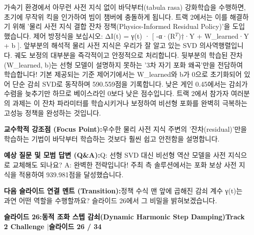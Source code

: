 \documentclass[11pt,a4paper]{article}
\begin{document}
\begin{tcolorbox}[colback=white,colframe=primaryblue,title={\footnotesize\bfseries\color{white}발표자 구두 대본 (Spoken Script)},fontupper=\small,left=6pt,right=6pt,top=3pt,bottom=3pt,boxrule=0.8pt,arc=2.5pt]
가속기 환경에서 아무런 사전 지식 없이 바닥부터(tabula rasa) 강화학습을 수행하면, 초기에 무작위 킥을 인가하여 빔이 챔버에 충돌하게 됩니다. 트랙 2에서는 이를 해결하기 위해 '물리 사전 지식 결합 잔차 정책(Physics-Informed Residual Policy)'을 도입했습니다. 제어 방정식을 보십시오: ΔI(t) = γ(t) · [ -α·(R$^T$)†·Y + W\_learned·Y + b ]. 앞부분의 해석적 물리 사전 지식은 우리가 잘 알고 있는 SVD 의사역행렬입니다. 궤도 보정의 대부분을 즉각적이고 안정적으로 처리합니다. 뒷부분의 학습된 잔차(W\_learned, b)는 선형 모델이 설명하지 못하는 '3차 자기 포화 왜곡'만을 전담하여 학습합니다! 기본 제공되는 기준 제어기에서는 W\_learned와 b가 0으로 초기화되어 있어 단순 감쇠 SVD로 동작하며 590.559점을 기록합니다. 낮은 게인 0.45에서는 감쇠가 수렴을 늦추기만 하므로 베이스라인 0보다 낮은 점수입니다. 트랙 2에서 참가자 여러분의 과제는 이 잔차 파라미터를 학습시키거나 보정하여 비선형 포화를 완벽히 극복하는 고성능 정책을 완성하는 것입니다.
\end{tcolorbox}
\vspace{0.2em}
\begin{tcolorbox}[colback=lightbg,colframe=bordergray,left=6pt,right=6pt,top=3pt,bottom=3pt,boxrule=0.6pt,arc=2.5pt]
\small
\noindent\textbf{\color{navy}교수학적 강조점 (Focus Point):}\enspace 우수한 물리 사전 지식 주변의 '잔차(residual)'만을 학습하는 기법이 바닥부터 학습하는 것보다 훨씬 쉽고 안전함을 설명합니다.\par\vspace{0.3em}
\noindent\textbf{\color{successgreen}예상 질문 및 모범 답변 (Q\&A):}\enspace Q: 선형 SVD 대신 비선형 역산 모델을 사전 지식으로 교체해도 되나요? A: 완벽한 전략입니다! 주최 측 솔루션에서는 포화 보상 사전 지식을 적용하여 939.981점을 달성했습니다.\par\vspace{0.3em}
\noindent\textbf{\color{accent}다음 슬라이드 연결 멘트 (Transition):}\enspace 정책 수식 맨 앞에 곱해진 감쇠 계수 γ(t)는 과연 어떤 역할을 수행할까요? 슬라이드 26에서 그 비밀을 밝혀보겠습니다.
\end{tcolorbox}
\clearpage
\hypertarget{slide.26}{}
{}
\noindent\begin{tcolorbox}[colback=navy,colframe=navy,left=6pt,right=6pt,top=3pt,bottom=3pt,boxrule=0pt,arc=2pt]
{\large\bfseries\color{white}슬라이드 26:\enspace 동적 조화 스텝 감쇠(Dynamic Harmonic Step Damping)}\hfill{\footnotesize\bfseries\color{white!85!lightbg}Track 2 Challenge \enspace$|$\enspace 슬라이드 26 / 34}
\end{tcolorbox}
\end{document}
